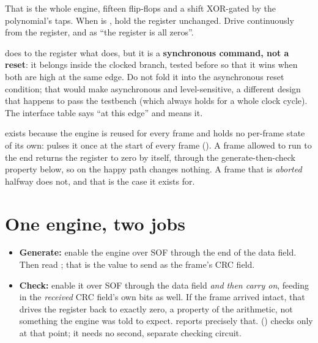 That is the whole engine, fifteen flip-flops and a shift XOR-gated by the polynomial's taps. When
 is , hold the register unchanged. Drive  continuously from the
register, and  as ``the register is all zeros''.

\begin{warning}
 does to the register what  does, but it is a \textbf{synchronous
command, not a reset}: it belongs inside the clocked branch, tested before  so that it
wins when both are high at the same edge. Do not fold it into the asynchronous reset condition; that
would make  asynchronous and level-sensitive, a different design that happens to pass the
testbench (which always holds  for a whole clock cycle). The interface table says ``at
this edge'' and means it.
\end{warning}

 exists because the engine is reused for every frame and holds no per-frame state of its
own:  pulses it once at the start of every frame (). A frame
allowed to run to the end returns the register to zero by itself, through the
generate-then-check property below, so on the happy path  changes nothing. A frame that
is \emph{aborted} halfway does not, and that is the case it exists for.

\section{One engine, two jobs}
\label{c13:sec:twojobs}

\begin{itemize}
  \item \textbf{Generate:} enable the engine over SOF through the end of the data field. Then read
    ; that is the value to send as the frame's CRC field.
  \item \textbf{Check:} enable it over SOF through the data field \emph{and then carry on}, feeding
    in the \emph{received} CRC field's own bits as well. If the frame arrived intact, that drives the
    register back to exactly zero, a property of the arithmetic, not something the engine was told to
    expect.  reports precisely that.  () checks
     only at that point; it needs no second, separate checking circuit.
\end{itemize}

